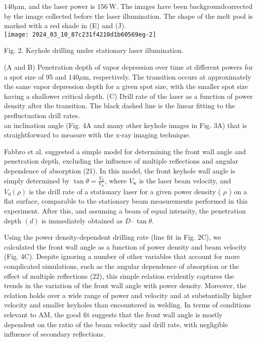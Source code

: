\documentclass[10pt]{article}
\begin{document}
$140 \mu \mathrm{m}$, and the laser power is $156 \mathrm{~W}$. The images have been backgroundcorrected by the image collected before the laser illumination. The shape of the melt pool is marked with a red shade in (E) and (J).\\
\texttt{[image: 2024\_03\_10\_87c231f4210d1b60569eg-2]}

Fig. 2. Keyhole drilling under stationary laser illumination.

(A and B) Penetration depth of vapor depression over time at different powers for a spot size of 95 and $140 \mu \mathrm{m}$, respectively. The transition occurs at approximately the same vapor depression depth for a given spot size, with the smaller spot size having a shallower critical depth. (C) Drill rate of the laser as a function of power density after the transition. The black dashed line is the linear fitting to the prefluctuation drill rates.\\
an inclination angle (Fig. 4A and many other keyhole images in Fig. 3A) that is straightforward to measure with the $\mathrm{x}$-ray imaging technique.

Fabbro et al. suggested a simple model for determining the front wall angle and penetration depth, excluding the influence of multiple reflections and angular dependence of absorption (21). In this model, the front keyhole wall angle is simply determined by $\tan \theta=\frac{V_{\mathrm{d}}}{V_{\mathrm{w}}}$, where $V_{\mathrm{w}}$ is the laser beam velocity, and $V_{\mathrm{d}}(\rho)$ is the drill rate of a stationary laser for a given power density ( $\rho$ ) on a flat surface, comparable to the stationary beam measurements performed in this experiment. After this, and assuming a beam of equal intensity, the penetration depth $(d)$ is immediately obtained as $D \cdot \tan \theta$.

Using the power density-dependent drilling rate (line fit in Fig. 2C), we calculated the front wall angle as a function of power density and beam velocity (Fig. 4C). Despite ignoring a number of other variables that account for more complicated simulations, such as the angular dependence of absorption or the effect of multiple reflections (22), this simple relation evidently captures the trends in the variation of the front wall angle with power density. Moreover, the relation holds over a wide range of power and velocity and at substantially higher velocity and smaller keyholes than encountered in welding. In terms of conditions relevant to $\mathrm{AM}$, the good fit suggests that the front wall angle is mostly dependent on the ratio of the beam velocity and drill rate, with negligible influence of secondary reflections.
\end{document}
